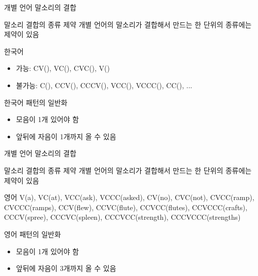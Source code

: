 \documentclass[11pt, aspectratio=169]{beamer}
\newcommand{\textds}[1]{{\ipafont #1}}
\begin{document}
\begin{frame}[t]{개별 언어 말소리의 결합}
    \begin{block}{말소리 결합의 종류 제약}
        개별 언어의 말소리가 결합해서 만드는 한 단위의 종류에는 제약이 있음
    \end{block}
    \begin{block}{한국어}
        \begin{itemize}
            \item 가능: CV(\textds{[ka]}), VC(\textds{[ak]}), CVC(\textds{[kak]}), V(\textds{[a]})
            \item 불가능: C(\textds{[k]}), CCV(\textds{[kka]}), CCCV(\textds{[kkka]}), VCC(\textds{[akk]}), VCCC(\textds{[akkk]}), CC(\textds{[kk]}), ...
        \end{itemize}
    \end{block}
    \begin{block}{한국어 패턴의 일반화}
        \begin{itemize}
            \item 모음이 1개 있어야 함
            \item 앞뒤에 자음이 1개까지 올 수 있음
        \end{itemize}
    \end{block}
\end{frame}

\begin{frame}[t]{개별 언어 말소리의 결합}
    \begin{block}{말소리 결합의 종류 제약}
        개별 언어의 말소리가 결합해서 만드는 한 단위의 종류에는 제약이 있음
    \end{block}
    \begin{block}{영어}
        V(a), VC(at), VCC(ask), VCCC(asked), CV(no), CVC(not), CVCC(ramp), CVCCC(ramps), CCV(flew), CCVC(flute), CCVCC(flutes), CCVCCC(crafts), CCCV(spree), CCCVC(spleen), CCCVCC(strength), CCCVCCC(strengths)
    \end{block}
    \begin{block}{영어 패턴의 일반화}
        \begin{itemize}
            \item 모음이 1개 있어야 함
            \item 앞뒤에 자음이 3개까지 올 수 있음
        \end{itemize}
    \end{block}
\end{frame}
\end{document}
